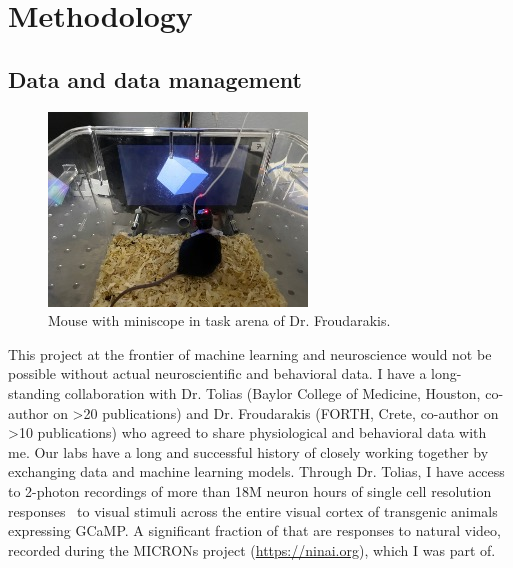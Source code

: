 \documentclass[B2,COG]{ercgrant}
\begin{document}
\section{Methodology}
\subsection{Data and data management}
\label{sub:data}

\begin{figure}
\vspace{-1.8ex}
\includegraphics[width=\linewidth,trim=25 15 10 30, clip]{figures/miniscope.jpg}
\caption{Mouse with miniscope in task arena of Dr. Froudarakis.}
\label{fig:miniscope}
\end{figure}
This project at the frontier of machine learning and neuroscience would not be possible without actual neuroscientific and behavioral data. 
I have a long-standing collaboration with Dr. Tolias (Baylor College of Medicine, Houston, co-author on >20  publications) and Dr. Froudarakis (FORTH, Crete, co-author on >10 publications) who agreed to share physiological and behavioral data with me.
Our labs have a long and successful history of closely working together by exchanging data and machine learning models. 
Through Dr. Tolias, I have access to 2-photon recordings of more than 18M neuron hours of single cell resolution responses~\parencite{Sofroniew2016-xg} to visual stimuli across the entire visual cortex of transgenic animals expressing GCaMP. A significant fraction of that are responses to natural video, recorded during the MICRONs project (\url{https://ninai.org}), which I was part of.
\end{document}
